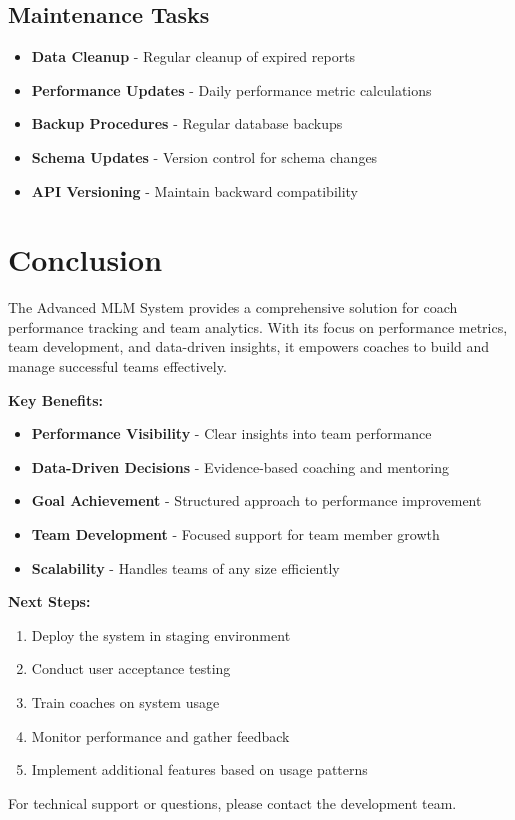 \documentclass[12pt,a4paper]{article}
\begin{document}
\subsection{Maintenance Tasks}
\begin{itemize}
    \item \textbf{Data Cleanup} - Regular cleanup of expired reports
    \item \textbf{Performance Updates} - Daily performance metric calculations
    \item \textbf{Backup Procedures} - Regular database backups
    \item \textbf{Schema Updates} - Version control for schema changes
    \item \textbf{API Versioning} - Maintain backward compatibility
\end{itemize}

\section{Conclusion}

The Advanced MLM System provides a comprehensive solution for coach performance tracking and team analytics. With its focus on performance metrics, team development, and data-driven insights, it empowers coaches to build and manage successful teams effectively.

\textbf{Key Benefits:}
\begin{itemize}
    \item \textbf{Performance Visibility} - Clear insights into team performance
    \item \textbf{Data-Driven Decisions} - Evidence-based coaching and mentoring
    \item \textbf{Goal Achievement} - Structured approach to performance improvement
    \item \textbf{Team Development} - Focused support for team member growth
    \item \textbf{Scalability} - Handles teams of any size efficiently
\end{itemize}

\textbf{Next Steps:}
\begin{enumerate}
    \item Deploy the system in staging environment
    \item Conduct user acceptance testing
    \item Train coaches on system usage
    \item Monitor performance and gather feedback
    \item Implement additional features based on usage patterns
\end{enumerate}

For technical support or questions, please contact the development team.
\end{document}
